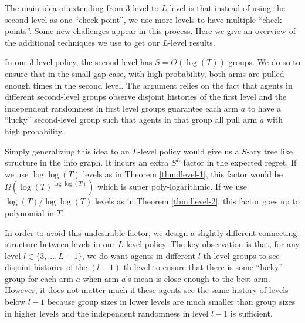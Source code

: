 The main idea of extending from 3-level to $L$-level is that instead of using the second level as one ``check-point'', we use more levels to have multiple ``check points''.  Some new challenges appear in this process. Here we give an overview of the additional techniques we use to get our $L$-level results. 

 In our 3-level policy, the second level has $S = \Theta(\log(T))$ groups. We do so to ensure that in the small gap case, with high probability, both arms are pulled enough times in the second level. The argument relies on the fact that agents in different second-level groups observe disjoint histories of the first level and the independent randomness in first level groups guarantee each arm $a$ to have a ``lucky'' second-level group such that agents in that group all pull arm $a$ with high probability. 

Simply generalizing this idea to an $L$-level policy would give us a $S$-ary tree like structure in the info graph. It incurs an extra $S^L$ factor in the expected regret. If we use $\log\log(T)$ levels as in Theorem \ref{thm:llevel-1}, this factor would be $\Omega\left(\log(T)^{\log\log(T)}\right)$ which is super poly-logarithmic. If we use $\log(T)/\log\log(T)$ levels as in Theorem \ref{thm:llevel-2}, this factor goes up to polynomial in $T$. 

In order to avoid this undesirable factor, we design a slightly different connecting structure between levels in our $L$-level policy. The key observation is that, for any level $l \in \{3,...,L-1\}$, we do want agents in different $l$-th level groups to see disjoint histories of the $(l-1)$-th level to ensure that there is some ``lucky'' group for each arm $a$ when arm $a$'s mean is close enough to the best arm. However, it does not matter much if these agents see the same history of levels below $l-1$ because group sizes in lower levels are much smaller than group sizes in higher levels and the independent randomness in level $l-1$ is sufficient.

